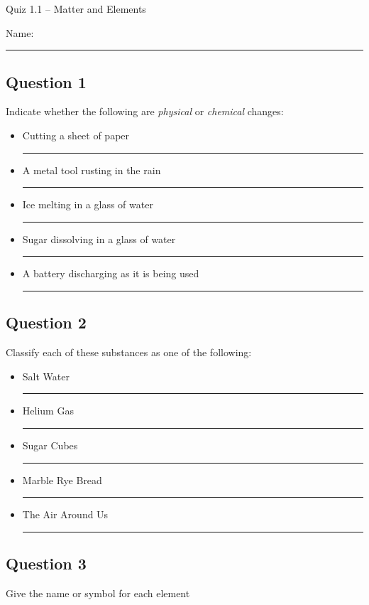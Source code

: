 \documentclass[11pt, letterpaper]{memoir}
\begin{document}
\begin{center}
	{\large Quiz 1.1 --	Matter and Elements }
\end{center}
{\large Name: \rule[-1mm]{4in}{.1pt}
\subsection*{Question 1}
Indicate whether the following are \emph{physical} or \emph{chemical} changes:
\begin{itemize}
	\item Cutting a sheet of paper \rule[-2pt]{8em}{1pt}
	\item A metal tool rusting in the rain \rule[-2pt]{8em}{1pt}
	\item Ice melting in a glass of water \rule[-2pt]{8em}{1pt}
	\item Sugar dissolving in a glass of water \rule[-2pt]{8em}{1pt}
	\item A battery discharging as it is being used \rule[-2pt]{8em}{1pt}
\end{itemize}
\subsection*{Question 2}
Classify each of these substances as one of the following:


\begin{itemize}
	\item Salt Water \rule[-2pt]{12em}{1pt}
	\item Helium Gas \rule[-2pt]{12em}{1pt}
	\item Sugar Cubes \rule[-2pt]{12em}{1pt}
	\item Marble Rye Bread \rule[-2pt]{12em}{1pt}
	\item The Air Around Us \rule[-2pt]{12em}{1pt}
\end{itemize}
\subsection*{Question 3}
Give the name or symbol for each element

}
\end{document}
